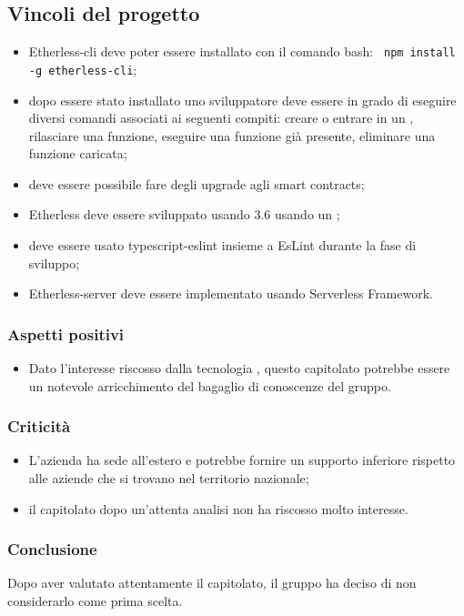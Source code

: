   \subsection{Vincoli del progetto}
    	   \begin{itemize}
    			\item Etherless-cli deve poter essere installato con il comando bash:
    			\verb! npm install -g etherless-cli!;

    			\item dopo essere stato installato uno sviluppatore deve essere in grado di eseguire diversi comandi associati ai seguenti compiti: creare o entrare in un  , rilasciare una funzione, eseguire una funzione già presente, eliminare una funzione caricata;
    			\item deve essere possibile fare degli upgrade agli smart contracts;
    			\item Etherless deve essere sviluppato usando  3.6 usando un ;
    			\item deve essere usato typescript-eslint insieme a EsLint durante la fase di sviluppo;
    			\item Etherless-server deve essere implementato usando Serverless Framework.
	 \end{itemize}


    \subsubsection{Aspetti positivi}
	    \begin{itemize}
    			\item Dato l'interesse riscosso dalla tecnologia , questo capitolato potrebbe essere un notevole arricchimento del bagaglio di conoscenze del gruppo.
    	   \end{itemize}
    \subsubsection{Criticità}
    	   \begin{itemize}
    			\item L'azienda ha sede all'estero e potrebbe fornire un supporto inferiore rispetto alle aziende che si trovano nel territorio nazionale;
    			\item il capitolato dopo un'attenta analisi non ha riscosso molto interesse.
    	   \end{itemize}
    \subsubsection{Conclusione}
	Dopo aver valutato attentamente il capitolato, il gruppo ha deciso di non considerarlo come prima scelta.
